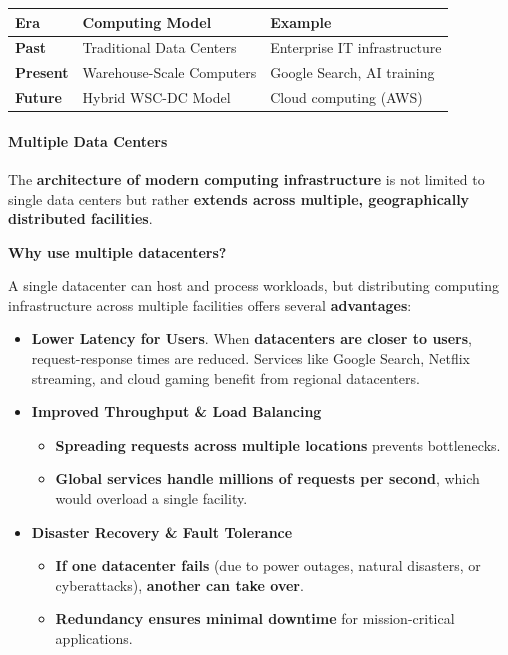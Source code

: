 \begin{table}[!htp]
    \centering
    \begin{tabular}{@{} l | l | l @{}}
        \toprule
        \textbf{Era} & \textbf{Computing Model} & \textbf{Example} \\
        \midrule
        \textbf{Past} & Traditional Data Centers & Enterprise IT infrastructure \\ [.3em]
        \textbf{Present} & Warehouse-Scale Computers & Google Search, AI training \\ [.3em]
        \textbf{Future} & Hybrid WSC-DC Model & Cloud computing (AWS) \\
        \bottomrule
    \end{tabular}
\end{table}

\newpage

\paragraph{Multiple Data Centers}

The \textbf{architecture of modern computing infrastructure} is not limited to single data centers but rather \textbf{extends across multiple, geographically distributed facilities}.

\highspace
\begin{flushleft}
    \textcolor{Green3}{ \textbf{Why use multiple datacenters?}}
\end{flushleft}
A single datacenter can host and process workloads, but distributing computing infrastructure across multiple facilities offers several \textbf{advantages}:
\begin{itemize}[label=\textcolor{Green3}{}]
    \item \textcolor{Green3}{\textbf{Lower Latency for Users}}. When \textbf{datacenters are closer to users}, request-response times are reduced. Services like Google Search, Netflix streaming, and cloud gaming benefit from regional datacenters.
    \item \textcolor{Green3}{\textbf{Improved Throughput \& Load Balancing}}
    \begin{itemize}
        \item \textbf{Spreading requests across multiple locations} prevents bottlenecks.
        \item \textbf{Global services handle millions of requests per second}, which would overload a single facility.
    \end{itemize}
    \item \textcolor{Green3}{\textbf{Disaster Recovery \& Fault Tolerance}}
    \begin{itemize}
        \item \textbf{If one datacenter fails} (due to power outages, natural disasters, or cyberattacks), \textbf{another can take over}.
        \item \textbf{Redundancy ensures minimal downtime} for mission-critical applications.
    \end{itemize}
\end{itemize}

